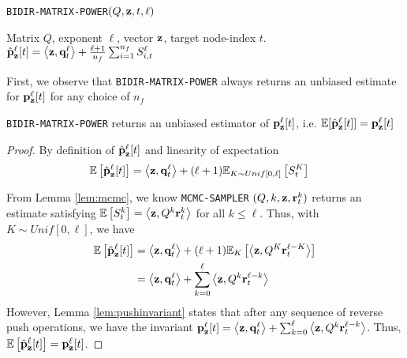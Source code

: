 \begin{algorithm}[ht]
\caption{\texttt{BIDIR-MATRIX-POWER}$(Q, \mathbf{z}, t,\ell)$}
\label{alg:linearsysest}
\begin{algorithmic}[1]
\REQUIRE Matrix $Q$, exponent $\ell$, vector $\mathbf{z}$, target node-index $t$.
\ENDFOR
\RETURN $\hat{\mathbf{p}}_\mathbf{z}^{\ell}[t] = \left< \mathbf{z}, \mathbf{q}^{\ell}_t \right> + \frac{\ell+1}{n_f} \sum_{i=1}^{n_f}S_{i,t}^\ell$
\end{algorithmic}
\end{algorithm} 

First, we observe that \texttt{BIDIR-MATRIX-POWER} always returns an unbiased estimate for ${\mathbf{p}}_\mathbf{z}^{\ell}[t]$ for any choice of $n_f$

\begin{lemma}
\texttt{BIDIR-MATRIX-POWER} returns an unbiased estimator of ${\mathbf{p}}_\mathbf{z}^{\ell}[t]$, i.e. $\mathbb{E}[\hat{\mathbf{p}}_\mathbf{z}^{\ell}[t]] = {\mathbf{p}}_\mathbf{z}^{\ell}[t]$
\end{lemma}

\begin{proof}
By definition of $\hat{\mathbf{p}}_\mathbf{z}^{\ell}[t]$ and linearity of expectation
\begin{align*}
\mathbb{E}\left[\hat{\mathbf{p}}_\mathbf{z}^{\ell}[t]\right] 
&= \left<\mathbf{z}, \mathbf{q}_t^{\ell} \right> + (\ell+1)\mathbb{E}_{K \sim Unif[0, \ell]}\left[S_{t}^{K}\right]
\end{align*}

From Lemma \ref{lem:mcmc}, we know \texttt{MCMC-SAMPLER} $(Q, k, \mathbf{z}, \mathbf{r}^{k}_t)$ returns an estimate satisfying $\mathbb{E}\left[S_{t}^{k}\right] = \left< \mathbf{z}, Q^k \mathbf{r}^{k}_t \right>$ for all $k\leq \ell$. Thus, with $K \sim Unif[0, \ell]$, we have
\begin{align*}
\mathbb{E}\left[\hat{\mathbf{p}}_\mathbf{z}^{\ell}[t] \right] &= \left<\mathbf{z}, \mathbf{q}_t^{\ell} \right> + (\ell+1)\mathbb{E}_K\left[\left< \mathbf{z}, Q^K \mathbf{r}_t^{\ell-K} \right> \right] \\
&= \left<\mathbf{z}, \mathbf{q}_t^{\ell} \right> + \sum_{k = 0}^\ell\left< \mathbf{z}, Q^k \mathbf{r}_t^{\ell-k} \right>
\end{align*}
However, Lemma \ref{lem:pushinvariant} states that after any sequence of reverse push operations, we have the invariant ${\mathbf{p}}_\mathbf{z}^{\ell}[t] = \left<\mathbf{z}, \mathbf{q}_t^{\ell} \right> + \sum_{k=0}^{\ell} \left<\mathbf{z}, Q^k\mathbf{r}_t^{\ell-k}\right>$. Thus, $\mathbb{E}\left[\hat{\mathbf{p}}_\mathbf{z}^{\ell}[t] \right] = {\mathbf{p}}_\mathbf{z}^{\ell}[t]$.
\end{proof}

